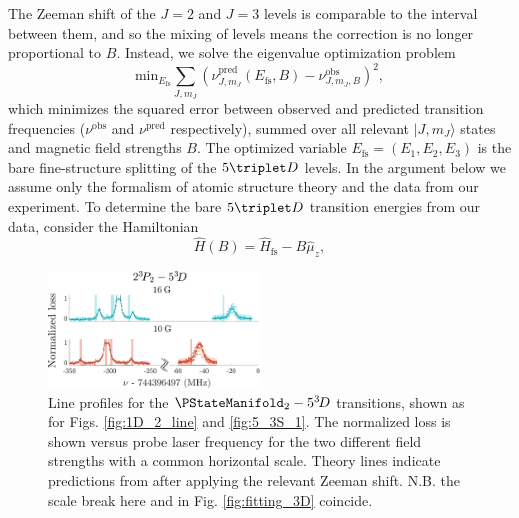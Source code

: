 The Zeeman shift of the $J=2$ and $J=3$ levels is comparable to the interval between them, and so the mixing of levels means the correction is no longer proportional to $B$.
	Instead, we solve the eigenvalue optimization problem 
%
\begin{equation}
\textrm{min}_{E_{\textrm{fs}}} \sum_{J,m_J} \left(\nu_{{J,m_J}}^{\textrm{{pred}}}(E_{\textrm{fs}},B) - \nu_{{J,m_J,B}}^{\textrm{{obs}}}\right)^2,
\label{eqn:opt-problem}
\end{equation}
%
which minimizes the squared error between observed and predicted transition frequencies ($\nu^{\textrm{{obs}}}$ and $\nu^{{\textrm{pred}}}$ respectively), summed over all relevant $|J,m_J\rangle$ states and magnetic field strengths $B$.
	The optimized variable $E_{\textrm{fs}}=(E_1,E_2,E_3)$ is the bare fine-structure splitting of the $5\triplet D$ levels.
	In the argument below we assume only the formalism of atomic structure theory and the data from our experiment.
	To determine the bare $5\triplet D$ transition energies from our data, consider the Hamiltonian
%
\begin{equation}
    \hat{H}(B) = \hat{H}_{\textrm{fs}} - B\hat{\mu}_z,
    \label{eqn:hamiltonian}
\end{equation}
%

\begin{figure}[t]
  \includegraphics[width=0.5\textwidth]{fig/spectroscopy/ci-plot-53D-eps-converted-to.pdf}
  \caption{Line profiles for the $\PStateManifold_2 -  5^{3\!}D$ transitions, shown as for Figs.
	\ref{fig:1D_2_line} and \ref{fig:5_3S_1}.
	The normalized loss is shown versus probe laser frequency for the two different field strengths with a common horizontal scale.
	Theory lines indicate predictions from \cite{Drake07} after applying the relevant Zeeman shift.
	N.B.
	the scale break here and in Fig.
	\ref{fig:fitting_3D} coincide.}
  \label{fig:combined_5D_lines}
\end{figure}

